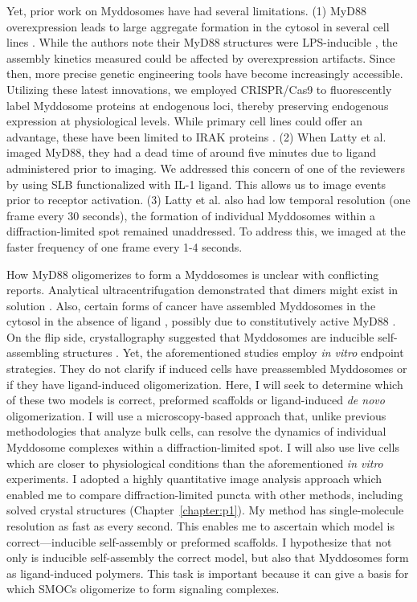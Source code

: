 Yet, prior work on Myddosomes have had several limitations. (1) MyD88 overexpression leads to large aggregate formation in the cytosol in several cell lines \autocite{Jaunin_1998}\autocite{Nishiya_2007}. While the authors note their MyD88 structures were LPS-inducible \autocite{Latty_2018}\autocite{Moncrieffe_2020}, the assembly kinetics measured could be affected by overexpression artifacts. Since then, more precise genetic engineering tools have become increasingly accessible. Utilizing these latest innovations, we employed CRISPR/Cas9 to fluorescently label Myddosome proteins at endogenous loci, thereby preserving endogenous expression at physiological levels. While primary cell lines could offer an advantage, these have been limited to IRAK proteins \autocite{De_2018}. (2) When Latty et al. imaged MyD88, they had a dead time of around five minutes due to ligand administered prior to imaging. We addressed this concern of one of the reviewers by using SLB functionalized with IL-1 ligand. This allows us to image events prior to receptor activation. (3) Latty et al. also had low temporal resolution (one frame every 30 seconds), the formation of individual Myddosomes within a diffraction-limited spot remained unaddressed. To address this, we imaged at the faster frequency of one frame every 1-4 seconds.
 
How MyD88 oligomerizes to form a Myddosomes is unclear with conflicting reports. Analytical ultracentrifugation demonstrated that dimers might exist in solution \autocite{Moncrieffe_2020}. Also, certain forms of cancer have assembled Myddosomes in the cytosol in the absence of ligand \autocite{Ngo_2011}, possibly due to constitutively active MyD88 \autocite{Treon_2012}. On the flip side, crystallography suggested that Myddosomes are inducible self-assembling structures \autocite{Kagan_2014}\autocite{Lin_2010}. Yet, the aforementioned studies employ \emph{in vitro} endpoint strategies. They do not clarify if induced cells have preassembled Myddosomes or if they have ligand-induced oligomerization. Here, I will seek to determine which of these two models is correct, preformed scaffolds or ligand-induced \emph{de novo} oligomerization. I will use a microscopy-based approach that, unlike previous methodologies that analyze bulk cells, can resolve the dynamics of individual Myddosome complexes within a diffraction-limited spot. I will also use live cells which are closer to physiological conditions than the aforementioned \emph{in vitro} experiments. I adopted a highly quantitative image analysis approach which enabled me to compare diffraction-limited puncta with other methods, including solved crystal structures \autocite{Deliz-Aguirre_2021} (Chapter~\ref{chapter:p1}). My method has single-molecule resolution as fast as every second. This enables me to ascertain which model is correct---inducible self-assembly or preformed scaffolds. I hypothesize that not only is inducible self-assembly the correct model, but also that Myddosomes form as ligand-induced polymers. This task is important because it can give a basis for which SMOCs oligomerize to form signaling complexes.
 
